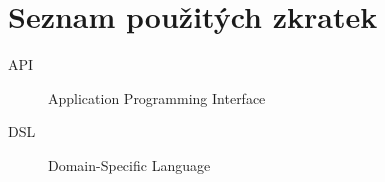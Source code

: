 \chapter{Seznam použitých zkratek}
\begin{description}
	\item[API] Application Programming Interface
	\item[DSL] Domain-Specific Language
\end{description}
